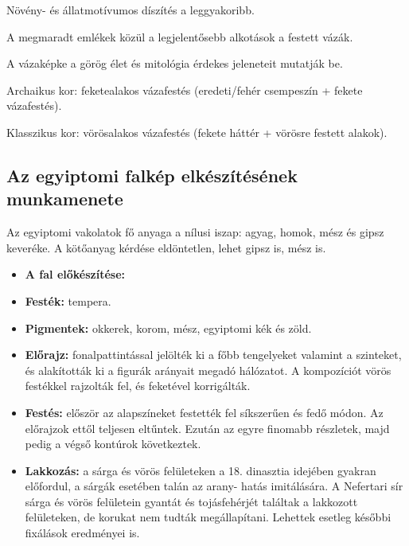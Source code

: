 	\begin{compactitem}
		\item Növény- és állatmotívumos díszítés a leggyakoribb.
		\item A megmaradt emlékek közül a legjelentősebb alkotások a festett vázák.
		\item A vázaképke a görög élet és mitológia érdekes jeleneteit mutatják be.
		\item Archaikus kor: feketealakos vázafestés (eredeti/fehér csempeszín + fekete vázafestés).
		\item Klasszikus kor: vörösalakos vázafestés (fekete háttér + vörösre festett alakok).
	\end{compactitem}


	\subsection{Az egyiptomi falkép elkészítésének munkamenete}
	
	Az egyiptomi vakolatok fő anyaga a nílusi iszap: agyag, homok, mész és gipsz keveréke. A kötőanyag kérdése eldöntetlen, lehet gipsz is, mész is.
	
	\begin{itemize}
		\item \textbf{A fal előkészítése:} 
		
		\item \textbf{Festék:} tempera.
		
		\item \textbf{Pigmentek:} okkerek, korom, mész, egyiptomi kék és zöld.
		
		\item \textbf{Előrajz:} fonalpattintással jelölték ki a főbb tengelyeket
		valamint a szinteket, és alakították ki a figurák arányait megadó hálózatot. A kompozíciót vörös festékkel rajzolták fel, és feketével korrigálták.
		
		\item \textbf{Festés:} először az alapszíneket festették fel síkszerűen és
		fedő módon. Az előrajzok ettől teljesen eltűntek. Ezután az egyre finomabb részletek, majd pedig a végső kontúrok következtek.
		
		\item \textbf{Lakkozás:} a sárga és vörös felületeken a 18. dinasztia idejében gyakran előfordul, a sárgák esetében talán az arany-
		hatás imitálására. A Nefertari sír sárga és vörös felületein gyantát és tojásfehérjét találtak a lakkozott felületeken, de korukat nem tudták megállapítani. Lehettek esetleg későbbi fixálások eredményei is.
	\end{itemize}
	
